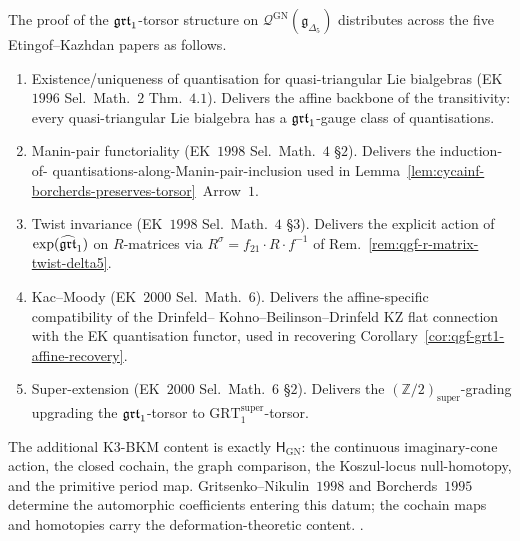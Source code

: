 \begin{remark}
\label{rem:qgf-ek-parts-assembly-vol3}
The proof of the $\mathfrak{grt}_1$-torsor structure on
$\mathcal Q^{\mathrm{GN}}(\mathfrak g_{\Delta_5})$ distributes
across the five Etingof--Kazhdan papers as follows.
\begin{enumerate}
\item[\textit{(EK I)}] Existence/uniqueness of quantisation for
 quasi-triangular Lie bialgebras (EK~$1996$ Sel.~Math.~$2$
 Thm.~$4.1$). Delivers the affine backbone of the
 transitivity: every quasi-triangular Lie bialgebra has a
 $\mathfrak{grt}_1$-gauge class of quantisations.
\item[\textit{(EK II)}] Manin-pair functoriality
 (EK~$1998$ Sel.~Math.~$4$ \S$2$). Delivers the induction-of-
 quantisations-along-Manin-pair-inclusion used in
 Lemma~\ref{lem:cycainf-borcherds-preserves-torsor}~Arrow~$1$.
\item[\textit{(EK III)}] Twist invariance
 (EK~$1998$ Sel.~Math.~$4$ \S$3$). Delivers the explicit
 action of $\exp(\widehat{\mathfrak{grt}}_1)$ on $R$-matrices via
 $R^\sigma = f_{21}\cdot R\cdot f^{-1}$ of
 Rem.~\ref{rem:qgf-r-matrix-twist-delta5}.
\item[\textit{(EK IV)}] Kac--Moody (EK~$2000$ Sel.~Math.~$6$).
 Delivers the affine-specific compatibility of the Drinfeld--
 Kohno--Beilinson--Drinfeld KZ flat connection with the EK
 quantisation functor, used in recovering
 Corollary~\ref{cor:qgf-grt1-affine-recovery}.
\item[\textit{(EK V)}] Super-extension (EK~$2000$ Sel.~Math.~$6$
 \S$2$). Delivers the $(\mathbb Z/2)_{\mathrm{super}}$-grading
 upgrading the $\mathfrak{grt}_1$-torsor to
 $\mathrm{GRT}_1^{\mathrm{super}}$-torsor.
\end{enumerate}
The additional K$3$-BKM content is exactly
$\mathsf H_{\mathrm{GN}}$: the continuous imaginary-cone action, the
closed cochain, the graph comparison, the Koszul-locus null-homotopy,
and the primitive period map.  Gritsenko--Nikulin~$1998$ and
Borcherds~$1995$ determine the automorphic coefficients entering this
datum; the cochain maps and homotopies carry the deformation-theoretic
content.
\cite{EtingofKazhdan1996,EtingofKazhdan1998a,EtingofKazhdan1998b,
 EtingofKazhdan2000,Borcherds1995,GritsenkoNikulin1998,
 Drinfeld1990}.
\end{remark}

